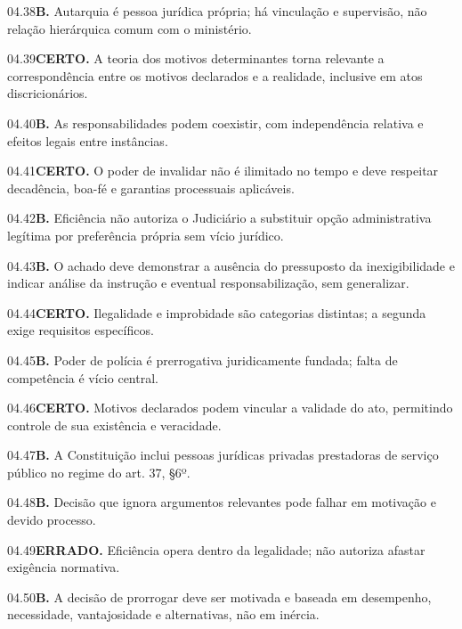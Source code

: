 \begin{solucao}{04.38}\textbf{B.} Autarquia é pessoa jurídica própria; há vinculação e supervisão, não relação hierárquica comum com o ministério.\end{solucao}
\begin{solucao}{04.39}\textbf{CERTO.} A teoria dos motivos determinantes torna relevante a correspondência entre os motivos declarados e a realidade, inclusive em atos discricionários.\end{solucao}
\begin{solucao}{04.40}\textbf{B.} As responsabilidades podem coexistir, com independência relativa e efeitos legais entre instâncias.\end{solucao}

\begin{solucao}{04.41}\textbf{CERTO.} O poder de invalidar não é ilimitado no tempo e deve respeitar decadência, boa-fé e garantias processuais aplicáveis.\end{solucao}
\begin{solucao}{04.42}\textbf{B.} Eficiência não autoriza o Judiciário a substituir opção administrativa legítima por preferência própria sem vício jurídico.\end{solucao}
\begin{solucao}{04.43}\textbf{B.} O achado deve demonstrar a ausência do pressuposto da inexigibilidade e indicar análise da instrução e eventual responsabilização, sem generalizar.\end{solucao}
\begin{solucao}{04.44}\textbf{CERTO.} Ilegalidade e improbidade são categorias distintas; a segunda exige requisitos específicos.\end{solucao}
\begin{solucao}{04.45}\textbf{B.} Poder de polícia é prerrogativa juridicamente fundada; falta de competência é vício central.\end{solucao}
\begin{solucao}{04.46}\textbf{CERTO.} Motivos declarados podem vincular a validade do ato, permitindo controle de sua existência e veracidade.\end{solucao}
\begin{solucao}{04.47}\textbf{B.} A Constituição inclui pessoas jurídicas privadas prestadoras de serviço público no regime do art. 37, §6º.\end{solucao}
\begin{solucao}{04.48}\textbf{B.} Decisão que ignora argumentos relevantes pode falhar em motivação e devido processo.\end{solucao}
\begin{solucao}{04.49}\textbf{ERRADO.} Eficiência opera dentro da legalidade; não autoriza afastar exigência normativa.\end{solucao}
\begin{solucao}{04.50}\textbf{B.} A decisão de prorrogar deve ser motivada e baseada em desempenho, necessidade, vantajosidade e alternativas, não em inércia.\end{solucao}

